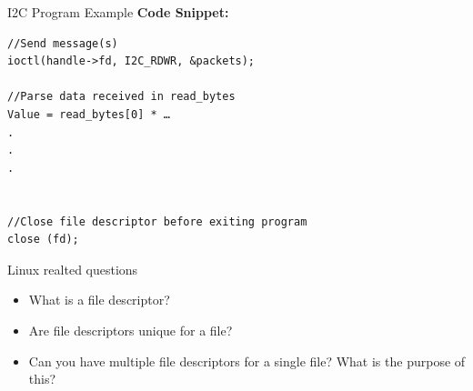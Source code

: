 \begin{frame}[fragile]{I2C Program Example}
    \textbf{Code Snippet:}
    \begin{verbatim}
//Send message(s)
ioctl(handle->fd, I2C_RDWR, &packets);

//Parse data received in read_bytes
Value = read_bytes[0] * …
.
.
.


//Close file descriptor before exiting program
close (fd);

    \end{verbatim}

\end{frame}

\begin{frame}{Linux realted questions}
    \begin{itemize}
        \item What is a file descriptor?
        \item Are file descriptors unique for a file?
        \item Can you have multiple file descriptors for a single file? What is the purpose of this?
    \end{itemize}    
\end{frame}



